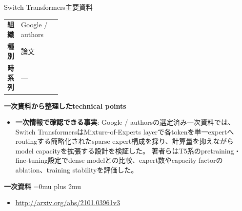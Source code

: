 \begin{technicalnote}{Switch Transformers}{主要資料}
\begingroup
\begin{tabularx}{\linewidth}{@{}>{\bfseries}p{0.22\linewidth}X@{}}
組織 & Google / authors \\
種別 & 論文 \\
時系列 & — \\
\end{tabularx}
\smallskip
{\bfseries 一次資料から整理したtechnical points}
\begin{itemize}[leftmargin=1.5em,itemsep=0.35em]
\item \textbf{一次情報で確認できる事実}: Google / authorsの選定済み一次資料では、Switch TransformersはMixture-of-Experts layerで各tokenを単一expertへroutingする簡略化されたsparse expert構成を採り、計算量を抑えながらmodel capacityを拡張する設計を検証した。 著者らはT5系のpretraining・fine-tuning設定でdense modelとの比較、expert数やcapacity factorのablation、training stabilityを評価した。
\end{itemize}
\begin{minipage}{\linewidth}
\begin{samepage}
{\bfseries 一次資料}
\begingroup\sloppy
\Urlmuskip=0mu plus 2mu\relax
\begin{itemize}[leftmargin=1.5em,itemsep=0.25em]
\item {\scriptsize\url{http://arxiv.org/abs/2101.03961v3}}
\end{itemize}
\endgroup
\end{samepage}
\end{minipage}
\endgroup
\end{technicalnote}
\medskip

